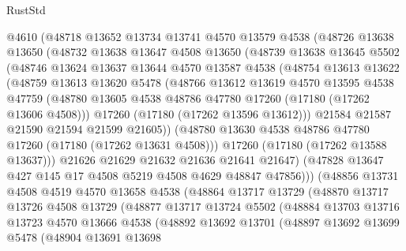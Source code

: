 \begin{lexlean}{RustStd}
\begin{coremodule}
{\begin{coremodule}
{{{{{{{{{{{{{{{{{{{{{{{{{{{{{{{{{{{{{{{{{{{{{{{{{{{{{{{        @4610
        (@48718
          @13652
          @13734
          @13741
          @4570
          @13579
          @4538
          (@48726
            @13638
            @13650
            (@48732
              @13638
              @13647
              @4508
              @13650
              (@48739
                @13638
                @13645
                @5502
                (@48746
                  @13624
                  @13637
                  @13644
                  @4570
                  @13587
                  @4538
                  (@48754
                    @13613
                    @13622
                    (@48759
                      @13613
                      @13620
                      @5478
                      (@48766
                        @13612
                        @13619
                        @4570
                        @13595
                        @4538
                        @47759
                        (@48780 @13605 @4538 @48786 @47780 @17260 (@17180 (@17262 @13606 @4508)))
                        @17260
                        (@17180 (@17262 @13596 @13612)))
                      @21584
                      @21587
                      @21590
                      @21594
                      @21599
                      @21605))
                  (@48780 @13630 @4538 @48786 @47780 @17260 (@17180 (@17262 @13631 @4508)))
                  @17260
                  (@17180 (@17262 @13588 @13637)))
                @21626
                @21629
                @21632
                @21636
                @21641
                @21647)
              (@47828 @13647 @427 @145 @17 @4508 @5219 @4508 @4629 @48847 @47856)))
          (@48856
            @13731
            @4508
            @4519
            @4570
            @13658
            @4538
            (@48864
              @13717
              @13729
              (@48870
                @13717
                @13726
                @4508
                @13729
                (@48877
                  @13717
                  @13724
                  @5502
                  (@48884
                    @13703
                    @13716
                    @13723
                    @4570
                    @13666
                    @4538
                    (@48892
                      @13692
                      @13701
                      (@48897
                        @13692
                        @13699
                        @5478
                        (@48904
                          @13691
                          @13698
}}}}}}}}}}}}}}}}}}}}}}}}}}}}}}}}}}}}}}}}}}}}}}}}}}}}}}}
\end{coremodule}}
\end{coremodule}
\end{lexlean}
